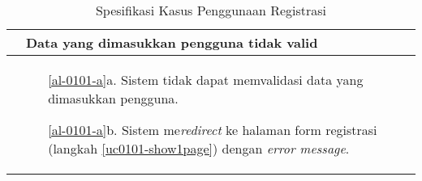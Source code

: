 \begin{table}[H]
\begin{tabular}{|r|p{8cm}|}
		\multicolumn{1}{|l|}{}                                           & \textbf{Data yang dimasukkan pengguna tidak valid}
			\\ \hline
		\multicolumn{1}{|l|}{}                                           & 
			 \begin{itemize}
			 	\item[\ref{al-0101-a}a.] Sistem tidak dapat memvalidasi data yang dimasukkan pengguna.
			 	\item[\ref{al-0101-a}b.] Sistem me\textit{redirect} ke halaman form registrasi (langkah \ref{uc0101-show1page}) dengan \textit{error message}.
			 \end{itemize}
		 \\ \hline
	\end{tabular}
	\caption{Spesifikasi Kasus Penggunaan Registrasi }
	\label{uc01.01}
\end{table}